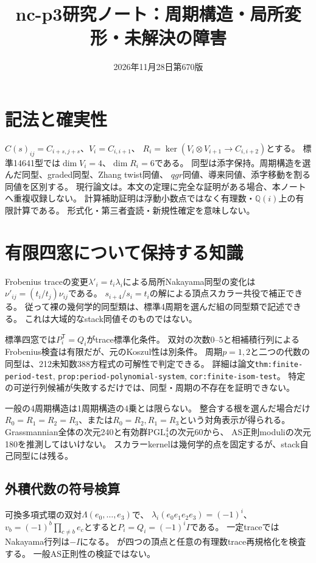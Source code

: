 \documentclass[11pt,a4paper]{ltjsarticle}
\title{nc-p3研究ノート：周期構造・局所変形・未解決の障害}
\author{}
\date{2026年11月28日\quad 第670版}
\begin{document}
\maketitle
\section{記法と確実性}
$C(s)_{ij}=C_{i+s,j+s}$、$V_i=C_{i,i+1}$、
$R_i=\ker(V_i\otimes V_{i+1}\to C_{i,i+2})$とする。
標準14641型では$\dim V_i=4$、$\dim R_i=6$である。
同型は添字保持。周期構造を選んだ同型、graded同型、Zhang twist同値、
$qgr$同値、導来同値、添字移動を割る同値を区別する。
現行論文は。本文の定理に完全な証明がある場合、本ノートへ重複収録しない。
計算補助証明は浮動小数点ではなく有理数・$\mathbb Q(i)$上の有限計算である。
形式化・第三者査読・新規性確定を意味しない。

\section{有限四窓について保持する知識}
Frobenius traceの変更$\lambda'_i=t_i\lambda_i$による局所Nakayama同型の変化は
$\nu'_{ij}=(t_i/t_j)\nu_{ij}$である。
$s_{i+4}/s_i=t_i$の解による頂点スカラー共役で補正できる。
従って裸の幾何学的同型類は、標準4周期を選んだ組の同型類で記述できる。
これは大域的なstack同値そのものではない。

標準四窓では$P_i^{\mathsf T}=Q_i$がtrace標準化条件。
双対の次数0--5と相補積行列によるFrobenius検査は有限だが、元のKoszul性は別条件。
周期$p=1,2$と二つの代数の同型は、212未知数388方程式の可解性で判定できる。
詳細は論文\texttt{thm:finite-period-test}, \texttt{prop:period-polynomial-system},
\texttt{cor:finite-isom-test}。
特定の可逆行列候補が失敗するだけでは、同型・周期の不存在を証明できない。

一般の4周期構造は1周期構造の4乗とは限らない。
整合する根を選んだ場合だけ$R_0=R_1=R_2=R_3$、または$R_0=R_2,R_1=R_3$という対角表示が得られる。
Grassmannian全体の次元240と有効群$\mathrm{PGL}_4^4$の次元60から、
AS正則moduliの次元180を推測してはいけない。
スカラーkernelは幾何学的点を固定するが、stack自己同型には残る。

\subsection*{外積代数の符号検算}
可換多項式環の双対$\Lambda(e_0,\ldots,e_3)$で、
$\lambda_i(e_0e_1e_2e_3)=(-1)^i$、
$v_b=(-1)^b\prod_{c\ne b}e_c$とすると$P_i=Q_i=(-1)^iI$である。
一定traceではNakayama行列は$-I$になる。
が四つの頂点と任意の有理数trace再規格化を検査する。
一般AS正則性の検証ではない。
\end{document}
